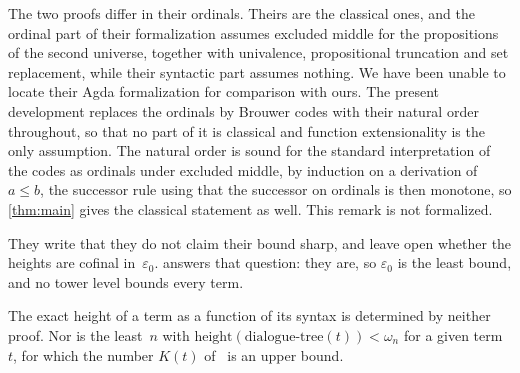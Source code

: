 \documentclass[11pt]{amsart}
\newcommand{\dtree}{\mathrm{dialogue\text{-}tree}}
\newcommand{\height}{\mathrm{height}}
\newcommand{\eps}{\varepsilon_{0}}
\newcommand{\tower}[1]{\omega_{#1}}           %
\theoremstyle{plain}
\theoremstyle{definition}
\begin{document}
The two proofs differ in their ordinals. Theirs are the classical
ones, and the ordinal part of their formalization assumes excluded
middle for the propositions of the second universe, together with
univalence, propositional truncation and set replacement, while their
syntactic part assumes nothing. We have been unable to locate their
Agda formalization for comparison with ours. The present development
replaces the ordinals by Brouwer codes with their natural order
throughout, so that no part of it is classical and function
extensionality is the only assumption. The natural order is sound
for the standard interpretation of the codes as ordinals under excluded
middle, by induction on a derivation of $a \le b$, the successor rule
using that the successor on ordinals is then monotone, so
\cref{thm:main} gives the classical statement as well. This remark is
not formalized.

They write that they do not claim their bound sharp, and leave open
whether the heights are cofinal in~$\eps$.  answers
that question: they are, so $\eps$ is the least bound, and no tower
level bounds every term.

\begin{question}
\label{q:exact}
The exact height of a term as a function of its syntax is determined
by neither proof. Nor is the least~$n$ with
$\height(\dtree(t)) < \tower n$ for a given term~$t$, for which the
number $K(t)$ of~\cite{XiaoSun2026} is an upper bound.
\end{question}
\end{document}
